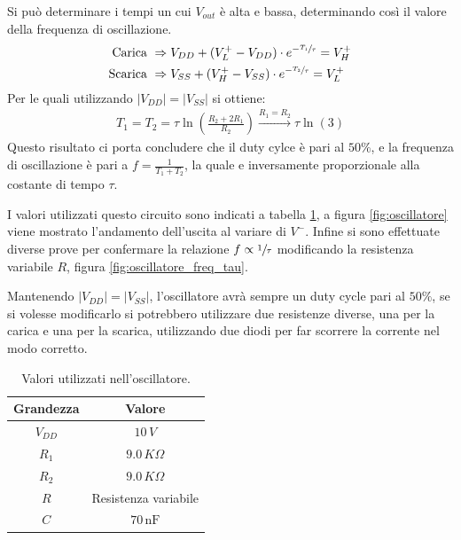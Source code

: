 \documentclass[a4paper,12pt]{article}
\begin{document}
Si può determinare i tempi un cui $V_{out}$ è alta e bassa, determinando così il valore della frequenza di oscillazione.
\begin{align*}
	\text{Carica}\,\,  & \Rightarrow V_{DD} + (V^+_L - V_{DD}) \cdot e^{-\sfrac{T_1}{\tau}} = V^+_H \\
	\text{Scarica}\,\, & \Rightarrow V_{SS} + (V^+_H - V_{SS}) \cdot e^{-\sfrac{T_2}{\tau}} = V^+_L
\end{align*}
Per le quali utilizzando $\left| V_{DD} \right| = \left| V_{SS} \right|$ si ottiene:
\begin{align*}
	T_1 = T_2 = \tau \ln\left( \frac{R_2 + 2R_1}{R_2} \right) \xrightarrow{R_1 = R_2} \tau \ln \left( 3 \right)
\end{align*}
Questo risultato ci porta concludere che il duty cylce è pari al $50\%$, e la frequenza di oscillazione è pari a $ f = \frac{1}{T_1 + T_2}$, la quale e inversamente proporzionale alla costante di tempo $\tau$.

\noindent I valori utilizzati questo circuito sono indicati a tabella \ref{tab:oscillatore}, a figura \ref{fig:oscillatore} viene mostrato l'andamento dell'uscita al variare di $V^-$. Infine si sono effettuate diverse prove per confermare la relazione $f \propto \sfrac{1}{\tau}$ modificando la resistenza variabile $R$, figura \ref{fig:oscillatore_freq_tau}.

\noindent Mantenendo $\left| V_{DD} \right| = \left| V_{SS} \right|$, l'oscillatore avrà sempre un duty cycle pari al $50\%$, se si volesse modificarlo si potrebbero utilizzare due resistenze diverse, una per la carica e una per la scarica, utilizzando due diodi per far scorrere la corrente nel modo corretto.
\begin{table}[h]
	\centering
	\setlength{\tabcolsep}{20pt}
	\begin{tabular}{c c}
		\toprule
		\textbf{Grandezza} & \textbf{Valore}               \\
		\midrule
		$V_{DD}$ & $10\,V$              \\
		$R_1$    & $9.0\,K\Omega$       \\
		$R_2$    & $9.0\,K\Omega$       \\
		$R$      & Resistenza variabile \\
		$C$      & $70\,\mathrm{nF}$    \\
		\bottomrule
	\end{tabular}
	\caption{Valori utilizzati nell'oscillatore.}
	\label{tab:oscillatore}
\end{table}
\end{document}
